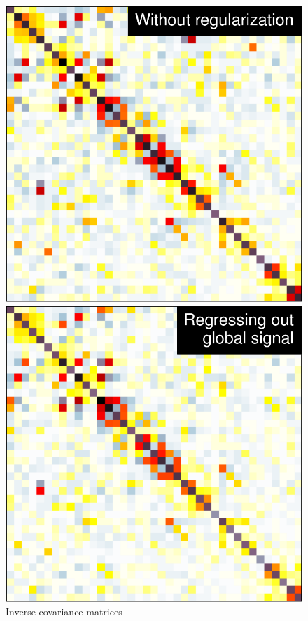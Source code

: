 \documentclass[5p]{elsarticle}
\begin{document}
\begin{figure}
\begin{minipage}{.32\linewidth}
    \includegraphics[width=\linewidth]{group_emp_prec.pdf}%

    \includegraphics[width=\linewidth]{group_emp_prec_global_mean.pdf}%
\end{minipage}%

\caption{
Inverse-covariance matrices
}
\end{figure}
\end{document}
